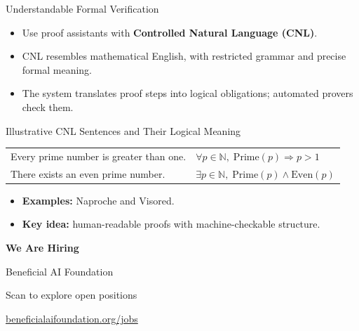 \documentclass[aspectratio=169,xcolor=dvipsnames]{beamer}
\begin{document}

\begin{frame}{Understandable Formal Verification}
    \begin{itemize}
        \item Use proof assistants with \textbf{Controlled Natural Language (CNL)}.
        \item CNL resembles mathematical English, with restricted grammar
              and precise formal meaning.
        \item The system translates proof steps into logical obligations;
              automated provers check them.
    \end{itemize}
    \begin{block}{Illustrative CNL Sentences and Their Logical Meaning}
        \small
        \begin{tabular}{@{}ll@{}}
            Every prime number is greater than one.
                & $\forall p\in\mathbb{N},\;\mathrm{Prime}(p)\Rightarrow p>1$ \\
            There exists an even prime number.
                & $\exists p\in\mathbb{N},\;\mathrm{Prime}(p)\land\mathrm{Even}(p)$
        \end{tabular}
    \end{block}
    \begin{itemize}
        \item \textbf{Examples:} Naproche and Visored.
        \item \textbf{Key idea:} human-readable proofs with machine-checkable structure.
    \end{itemize}
\end{frame}

\begin{frame}
    \centering
    {\Huge\textbf{We Are Hiring}\par}
    \medskip
    {\large Beneficial AI Foundation\par}
    \bigskip
    \bigskip

    {\small Scan to explore open positions\par}
    \medskip
    \href{https://www.beneficialaifoundation.org/jobs}{\footnotesize beneficialaifoundation.org/jobs}
\end{frame}

\end{document}
